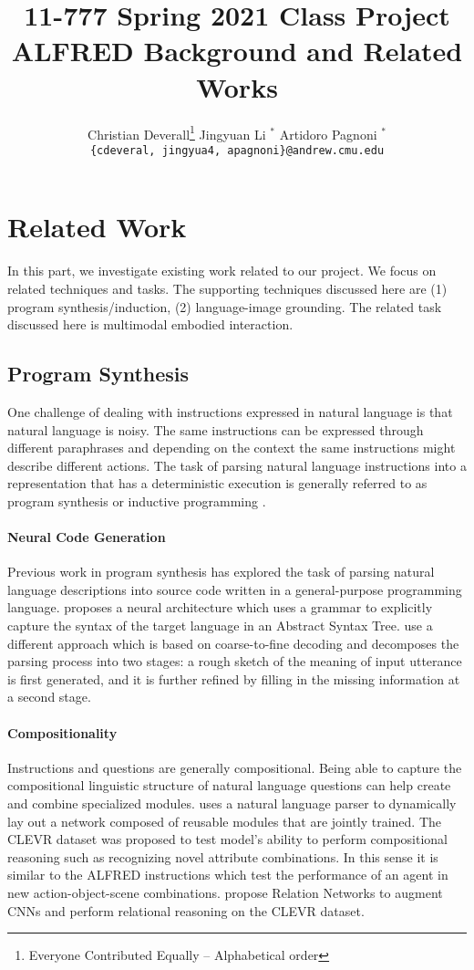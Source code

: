 \documentclass[11pt,a4paper]{article}
\title{11-777 Spring 2021 Class Project\\
ALFRED Background and Related Works}
\author{
  Christian Deverall\thanks{\hspace{4pt}Everyone Contributed Equally -- Alphabetical order} \hspace{2em} Jingyuan Li $^*$ \hspace{2em} Artidoro Pagnoni $^*$ \\
  \texttt{\{cdeveral, jingyua4, apagnoni\}@andrew.cmu.edu}
  }
\date{}
\begin{document}
\maketitle

\section{Related Work}
In this part, we investigate existing work related to our project. We focus on related techniques and tasks. The supporting techniques discussed here are (1) program synthesis/induction, (2) language-image grounding. The related task discussed here is multimodal embodied interaction.

\subsection{Program Synthesis}
One challenge of dealing with instructions expressed in natural language is that natural language is noisy. The same instructions can be expressed through different paraphrases and depending on the context the same instructions might describe different actions. The task of parsing natural language instructions into a representation that has a deterministic execution is generally referred to as program synthesis or inductive programming \citep{summers1977methodology, muggleton1994inductive}. 

\paragraph{Neural Code Generation} Previous work in program synthesis has explored the task of parsing natural language descriptions into source code written in a general-purpose programming language. \citet{yin2017syntactic} proposes a neural architecture which uses a grammar to explicitly capture the syntax of the target language in an Abstract Syntax Tree. \citet{dong2018coarse} use a different approach which is based on coarse-to-fine decoding and decomposes the parsing process into two stages: a rough sketch of the meaning of input utterance is first generated, and it is further refined by filling in the missing information at a second stage.

\paragraph{Compositionality} Instructions and questions are generally compositional. Being able to capture the compositional linguistic structure of natural language questions can help create and combine specialized modules. 
\citet{andreas2016neural} uses a natural language parser to dynamically lay out a network composed of reusable modules that are jointly trained. The CLEVR dataset \citep{johnson2017clevr} was proposed to test model's ability to perform compositional reasoning such as recognizing novel attribute combinations. In this sense it is similar to the ALFRED \citet{ALFRED20} instructions which test the performance of an agent in new action-object-scene combinations. \citet{santoro2017simple} propose Relation Networks to augment CNNs and perform relational reasoning on the CLEVR dataset.
\end{document}
